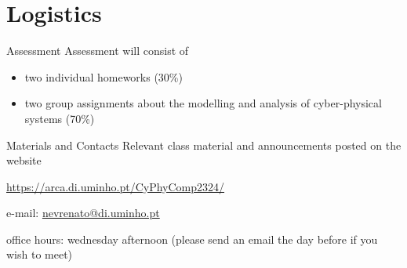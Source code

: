 \documentclass{beamer}
\begin{document}
\section{Logistics}

\begin{frame}{Assessment}
  Assessment will consist of
  \begin{itemize}
  \item two individual homeworks (30\%)
  \item two group assignments about the modelling and analysis of cyber-physical systems (70\%)
  \end{itemize}
\end{frame}

\begin{frame}{Materials and Contacts}
  Relevant class material and announcements posted on the website

  \url{https://arca.di.uminho.pt/CyPhyComp2324/}

  e-mail: \href{mailto:nevrenato@di.uminho.pt}{nevrenato@di.uminho.pt}

  office hours: wednesday afternoon (please send an email the day before if you wish to meet)
\end{frame}

\nocite{rajkumar10,lee06}


\end{document}
